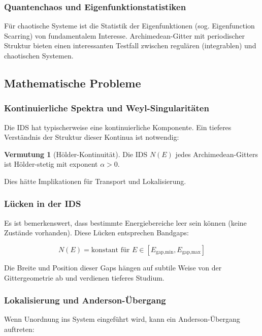 \documentclass[a4paper,12pt]{article}
\theoremstyle{definition}
\newtheorem{vermutung}{Vermutung}[section]
\begin{document}
\subsubsection{Quantenchaos und Eigenfunktionstatistiken}

Für chaotische Systeme ist die Statistik der Eigenfunktionen (sog. Eigenfunction Scarring) von fundamentalem Interesse. Archimedean-Gitter mit periodischer Struktur bieten einen interessanten Testfall zwischen regulären (integrablen) und chaotischen Systemen.

\subsection{Mathematische Probleme}

\subsubsection{Kontinuierliche Spektra und Weyl-Singularitäten}

Die IDS hat typischerweise eine kontinuierliche Komponente. Ein tieferes Verständnis der Struktur dieser Kontinua ist notwendig:

\begin{vermutung}[Hölder-Kontinuität]
	Die IDS $N(E)$ jedes Archimedean-Gitters ist Hölder-stetig mit exponent $\alpha > 0$.
\end{vermutung}

Dies hätte Implikationen für Transport und Lokalisierung.

\subsubsection{Lücken in der IDS}

Es ist bemerkenswert, dass bestimmte Energiebereiche leer sein können (keine Zustände vorhanden). Diese Lücken entsprechen Bandgaps:

\[
N(E) = \text{konstant für } E \in [E_{\text{gap,min}}, E_{\text{gap,max}}]
\]

Die Breite und Position dieser Gaps hängen auf subtile Weise von der Gittergeometrie ab und verdienen tieferes Studium.

\subsubsection{Lokalisierung und Anderson-Übergang}

Wenn Unordnung ins System eingeführt wird, kann ein Anderson-Übergang auftreten:
\end{document}
